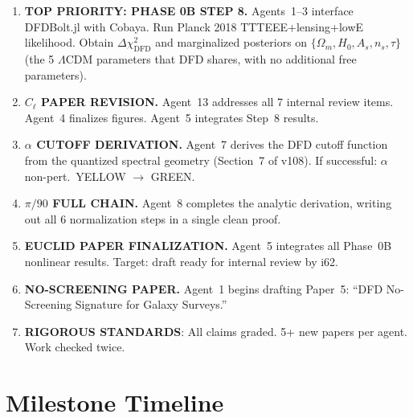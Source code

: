 \documentclass[11pt,a4paper]{article}
\begin{document}
\begin{enumerate}
\item \textbf{TOP PRIORITY: PHASE 0B STEP 8.} Agents~1--3 interface DFDBolt.jl with Cobaya. Run Planck 2018 TTTEEE+lensing+lowE likelihood. Obtain $\Delta\chi^2_{\mathrm{DFD}}$ and marginalized posteriors on $\{\Omega_m, H_0, A_s, n_s, \tau\}$ (the 5 $\Lambda$CDM parameters that DFD shares, with no additional free parameters).

\item \textbf{$C_\ell$ PAPER REVISION.} Agent~13 addresses all 7 internal review items. Agent~4 finalizes figures. Agent~5 integrates Step~8 results.

\item \textbf{$\alpha$ CUTOFF DERIVATION.} Agent~7 derives the DFD cutoff function from the quantized spectral geometry (Section~7 of v108). If successful: $\alpha$ non-pert.\ YELLOW $\to$ GREEN.

\item \textbf{$\pi/90$ FULL CHAIN.} Agent~8 completes the analytic derivation, writing out all 6 normalization steps in a single clean proof.

\item \textbf{EUCLID PAPER FINALIZATION.} Agent~5 integrates all Phase~0B nonlinear results. Target: draft ready for internal review by i62.

\item \textbf{NO-SCREENING PAPER.} Agent~1 begins drafting Paper~5: ``DFD No-Screening Signature for Galaxy Surveys.''

\item \textbf{RIGOROUS STANDARDS}: All claims graded. 5+ new papers per agent. Work checked twice.
\end{enumerate}


\section{Milestone Timeline}
\label{sec:timeline}
\end{document}
